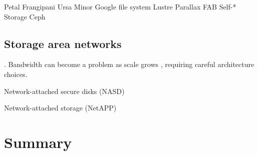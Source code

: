 Petal \cite{lee95,lee96}
Frangipani \cite{thekkath}
Ursa Minor \cite{abd-el-malek}
Google file system \cite{ghemawat}
Lustre \cite{lustre}
Parallax \cite{warfield}
FAB \cite{frolund,saito04,ji}
Self-* Storage \cite{ganger}
Ceph \cite{weil}

\subsection{Storage area networks}
\cite{burns}. Bandwidth can become a problem as scale grows \cite{hospodor}, requiring careful architecture choices.

Network-attached secure disks (NASD) \cite{gibson97,gibson98a}

Network-attached storage (NetAPP) \cite{hitz}

\section{Summary}
